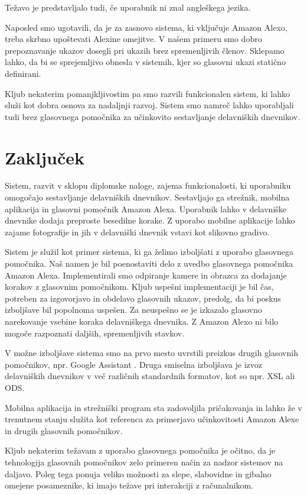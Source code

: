 \documentclass[a4paper, 12pt]{book}
\begin{document}
Težavo je predstavljalo tudi, če uporabnik ni znal angleškega jezika.

Naposled smo ugotavili, da je za zasnovo sistema, ki vključuje Amazon Alexo, treba skrbno upoštevati Alexine omejitve.
V našem primeru smo dobro prepoznavanje ukazov dosegli pri ukazih brez spremenljivih členov.
Sklepamo lahko, da bi se sprejemljivo obnesla v sistemih, kjer so glasovni ukazi statično definirani.

Kljub nekaterim pomanjkljivostim pa smo razvili funkcionalen sistem, ki lahko služi kot dobra osnova za nadaljnji razvoj.
Sistem smo namreč lahko uporabljali tudi brez glasovnega pomočnika za učinkovito sestavljanje delavniških dnevnikov.




\chapter{Zaključek}

Sistem, razvit v sklopu diplomske naloge, zajema funkcionalosti, ki uporabniku omogočajo sestavljanje delavniških dnevnikov.
Sestavljajo ga strežnik, mobilna aplikacija in glasovni pomočnik Amazon Alexa.
Uporabnik lahko v delavniške dnevnike dodaja preproste besedilne korake.
Z uporabo mobilne aplikacije lahko zajame fotografije in jih v delavniški dnevnik vstavi kot slikovno gradivo.

Sistem je služil kot primer sistema, ki ga želimo izboljšati z uporabo glasovnega pomočnika.
Naš namen je bil poenostaviti delo z uvedbo glasovnega pomočnika Amazon Alexa.
Implementirali smo odpiranje kamere in obrazca za dodajanje korakov z glasovnim pomočnikom.
Kljub uspešni implementaciji je bil čas, potreben za izgovorjavo in obdelavo glasovnih ukazov, predolg, da bi poskus izboljšave bil popolnoma uspešen.
Za neuspešno se je izkazalo glasovno narekovanje vsebine koraka delavniškega dnevnika.
Z Amazon Alexo ni bilo mogoče razpoznati daljših, spremenljivih stavkov.

V možne izboljšave sistema smo na prvo mesto uvrstili preizkus drugih glasovnih pomočnikov, npr. Google Assistant \cite{googleass}.
Druga smiselna izboljšava je izvoz delavniških dnevnikov v več različnih standardnih formatov, kot so npr. XSL ali ODS.

Mobilna aplikacija in strežniški program sta zadovoljila pričakovanja in lahko že v trenutnem stanju služita kot referenca za primerjavo učinkovitosti Amazon Alexe in drugih glasovnih pomočnikov.

Kljub nekaterim težavam z uporabo glasovnega pomočnika je očitno, da je tehnologija glasovnih pomočnikov zelo primeren način za nadzor sistemov na daljavo.
Poleg tega ponuja veliko možnosti za slepe, slabovidne in gibalno omejene posameznike, ki imajo težave pri interakciji z računalnikom.




\newpage %
\ \\
\clearpage
{}

\printbibliography
\end{document}
